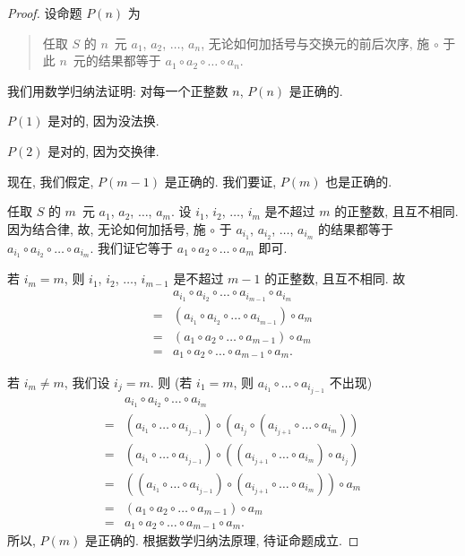 \begin{proof}
    设命题 \(P(n)\) 为
    \begin{quotation}
        任取 \(S\) 的 \(n\)~元
        \(a_1\), \(a_2\), \(\dots\), \(a_n\),
        无论如何加括号与交换元的前后次序,
        施 \(\circ\) 于此 \(n\)~元的结果都等于
        \(a_1 \circ a_2 \circ \dots \circ a_n\).
    \end{quotation}
    我们用数学归纳法证明:
    对每一个正整数 \(n\), \(P(n)\) 是正确的.

    \(P(1)\) 是对的, 因为没法换.

    \(P(2)\) 是对的, 因为交换律.

    现在, 我们假定, \(P(m-1)\) 是正确的.
    我们要证, \(P(m)\) 也是正确的.

    任取 \(S\) 的 \(m\)~元
    \(a_1\), \(a_2\), \(\dots\), \(a_m\).
    设 \(i_1\), \(i_2\), \(\dots\), \(i_m\)
    是不超过 \(m\) 的正整数,
    且互不相同.
    因为结合律, 故, 无论如何加括号,
    施 \(\circ\) 于
    \(a_{i_1}\), \(a_{i_2}\), \(\dots\), \(a_{i_m}\)
    的结果都等于
    \(a_{i_1} \circ a_{i_2} \circ \dots \circ a_{i_m}\).
    我们证它等于
    \(a_1 \circ a_2 \circ \dots \circ a_m\)
    即可.

    若 \(i_m = m\),
    则 \(i_1\), \(i_2\), \(\dots\), \(i_{m-1}\)
    是不超过 \(m-1\) 的正整数,
    且互不相同.
    故
    \begin{align*}
             & a_{i_1} \circ a_{i_2} \circ
        \dots \circ a_{i_{m-1}} \circ a_{i_m}               \\
        = {} &
        (a_{i_1} \circ a_{i_2} \circ
        \dots \circ a_{i_{m-1}}) \circ a_m                  \\
        = {} &
        (a_1 \circ a_2 \circ \dots \circ a_{m-1}) \circ a_m \\
        = {} &
        a_1 \circ a_2 \circ \dots \circ a_{m-1} \circ a_m.
    \end{align*}

    若 \(i_m \neq m\),
    我们设 \(i_j = m\).
    则
    (若 \(i_1 = m\),
    则 \(a_{i_1} \circ \dots \circ a_{i_{j-1}}\)
    不出现)
    \begin{align*}
             & a_{i_1} \circ a_{i_2} \circ
        \dots \circ a_{i_m}                                 \\
        = {} & (a_{i_1} \circ \dots \circ a_{i_{j-1}})
        \circ (a_{i_j}
        \circ (a_{i_{j+1}} \circ \dots \circ a_{i_m}))      \\
        = {} & (a_{i_1} \circ \dots \circ a_{i_{j-1}})
        \circ ((a_{i_{j+1}} \circ \dots \circ a_{i_m})
        \circ a_{i_j})                                      \\
        = {} & ((a_{i_1} \circ \dots \circ a_{i_{j-1}})
        \circ (a_{i_{j+1}} \circ \dots \circ a_{i_m}))
        \circ a_m                                           \\
        = {} &
        (a_1 \circ a_2 \circ \dots \circ a_{m-1}) \circ a_m \\
        = {} &
        a_1 \circ a_2 \circ \dots \circ a_{m-1} \circ a_m.
    \end{align*}
    所以, \(P(m)\) 是正确的.
    根据数学归纳法原理, 待证命题成立.
\end{proof}

